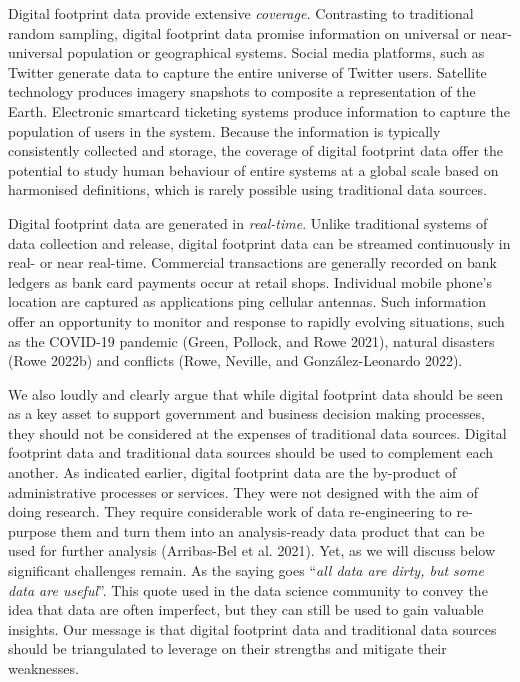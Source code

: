 \documentclass[
  letterpaper,
  DIV=11,
  numbers=noendperiod]{scrreprt}
\begin{document}
Digital footprint data provide extensive \emph{coverage.} Contrasting to
traditional random sampling, digital footprint data promise information
on universal or near-universal population or geographical systems.
Social media platforms, such as Twitter generate data to capture the
entire universe of Twitter users. Satellite technology produces imagery
snapshots to composite a representation of the Earth. Electronic
smartcard ticketing systems produce information to capture the
population of users in the system. Because the information is typically
consistently collected and storage, the coverage of digital footprint
data offer the potential to study human behaviour of entire systems at a
global scale based on harmonised definitions, which is rarely possible
using traditional data sources.

Digital footprint data are generated in \emph{real-time}. Unlike
traditional systems of data collection and release, digital footprint
data can be streamed continuously in real- or near real-time. Commercial
transactions are generally recorded on bank ledgers as bank card
payments occur at retail shops. Individual mobile phone's location are
captured as applications ping cellular antennas. Such information offer
an opportunity to monitor and response to rapidly evolving situations,
such as the COVID-19 pandemic (Green, Pollock, and Rowe 2021), natural
disasters (Rowe 2022b) and conflicts (Rowe, Neville, and
González-Leonardo 2022).

We also loudly and clearly argue that while digital footprint data
should be seen as a key asset to support government and business
decision making processes, they should not be considered at the expenses
of traditional data sources. Digital footprint data and traditional data
sources should be used to complement each another. As indicated earlier,
digital footprint data are the by-product of administrative processes or
services. They were not designed with the aim of doing research. They
require considerable work of data re-engineering to re-purpose them and
turn them into an analysis-ready data product that can be used for
further analysis (Arribas-Bel et al. 2021). Yet, as we will discuss
below significant challenges remain. As the saying goes ``\emph{all data
are dirty, but some data are useful}''. This quote used in the data
science community to convey the idea that data are often imperfect, but
they can still be used to gain valuable insights. Our message is that
digital footprint data and traditional data sources should be
triangulated to leverage on their strengths and mitigate their
weaknesses.
\end{document}
